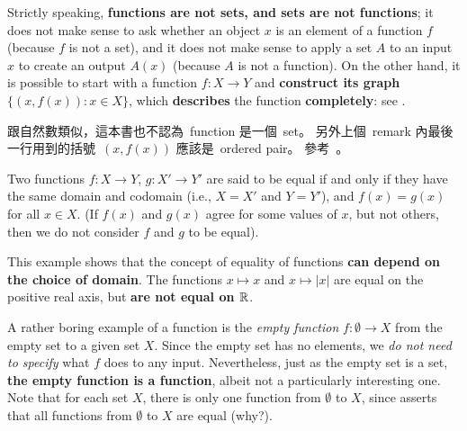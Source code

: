 \begin{remark} \label{remark 3.3.6}
Strictly speaking, \textbf{functions are not sets, and sets are not functions}; it does not make sense to ask whether an object \(x\) is an element of a function \(f\)(because \(f\) is not a set), and it does not make sense to apply a set \(A\) to an input \(x\) to create an output \(A(x)\) (because \(A\) is not a function).
On the other hand, it is possible to start with a function \(f : X \rightarrow Y\) and \textbf{construct its graph} \(\{(x, f(x)) : x \in X\}\), which \textbf{describes} the function \textbf{completely}:
see .
\end{remark}

\begin{note}
跟自然數類似，這本書也不認為\ function 是一個\ set。
另外上個\ remark 內最後一行用到的括號\ \((x, f(x))\) 應該是\ ordered pair。
參考\ 。
\end{note}

\begin{definition}  \label{def 3.3.7}
Two functions \(f: X \rightarrow Y\), \(g: X' \rightarrow Y'\) are said to be equal if and only if they have the same domain and codomain (i.e., \(X = X'\) and \(Y = Y'\)), and \(f(x) = g(x)\) for all \(x \in X\).
(If \(f(x)\) and \(g(x)\) agree for some values of \(x\), but not others, then we do not consider \(f\) and \(g\) to be equal).
\end{definition}

\begin{example} \label{example 3.8.8}
This example shows that the concept of equality of functions \textbf{can depend on the choice of domain}.
The functions \(x \mapsto x\) and \(x \mapsto |x|\) are equal on the positive real axis, but \textbf{are not equal on \(\mathbb{R}\)}.
\end{example}

\begin{example}
A rather boring example of a function is the \emph{empty function} \(f : \emptyset \rightarrow X\) from the empty set to a given set \(X\).
Since the empty set has no elements, we \emph{do not need to specify} what \(f\) does to any input.
Nevertheless, just as the empty set is a set, \textbf{the empty function is a function}, albeit not a particularly interesting one.
Note that for each set \(X\), there is only one function from \(\emptyset\) to \(X\), since  asserts that all functions from \(\emptyset\) to \(X\) are equal (why?).
\end{example}

